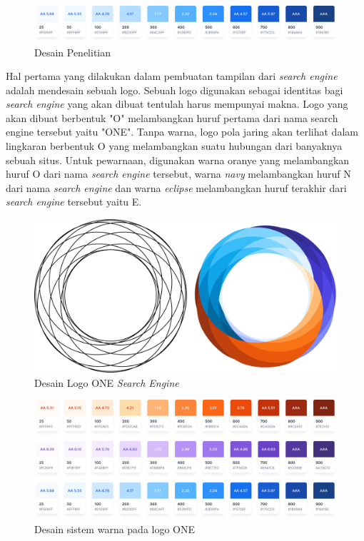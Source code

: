 \begin{enumerate}[label=\alph*)., leftmargin=1\parindent]
	
	\begin{figure}[H]
		\centering
		\includegraphics[keepaspectratio, width=13cm]{gambar/g-110.png}
		\caption{Desain Penelitian}
		\label{gambar:g-110.png}
	\end{figure}
	
	Hal pertama yang dilakukan dalam pembuatan tampilan dari \textit{search engine} adalah mendesain sebuah logo. Sebuah logo digunakan sebagai identitas bagi \textit{search engine} yang akan dibuat tentulah harus mempunyai makna. Logo yang akan dibuat berbentuk "O" melambangkan huruf pertama dari nama search engine tersebut yaitu "ONE". Tanpa warna, logo pola jaring akan terlihat dalam lingkaran berbentuk O yang melambangkan suatu hubungan dari banyaknya sebuah situs. Untuk pewarnaan, digunakan warna oranye yang melambangkan huruf O dari nama \textit{search engine} tersebut, warna \textit{navy} melambangkan huruf N dari nama \textit{search engine} dan warna \textit{eclipse} melambangkan huruf terakhir dari \textit{search engine} tersebut yaitu E.
	
	
	\begin{figure}[H]
		\centering
		\includegraphics[keepaspectratio, width=13cm]{gambar/g-111.png}
		\caption{Desain Logo ONE \textit{Search Engine}}
		\label{gambar:g-111.png}
	\end{figure}
	
	\begin{figure}[H]
		\centering
		\includegraphics[keepaspectratio, width=13cm]{gambar/g-113.png}
		\caption{Desain sistem warna pada logo ONE}
		\label{gambar:g-113.png}
	\end{figure}
	

\end{enumerate}
